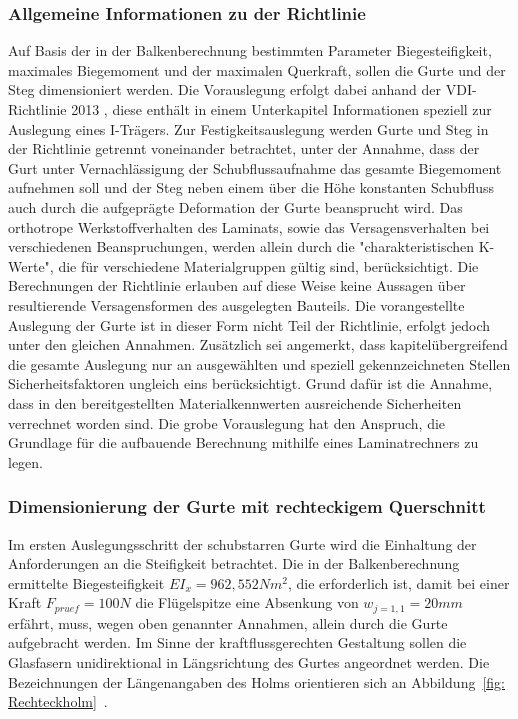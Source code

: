 \subsubsection{Allgemeine Informationen zu der Richtlinie}
Auf Basis der in der Balkenberechnung bestimmten Parameter Biegesteifigkeit, maximales Biegemoment und der maximalen Querkraft, sollen die Gurte und der Steg dimensioniert werden. Die Vorauslegung erfolgt dabei anhand der VDI-Richtlinie 2013 \cite{item5}, diese enthält in einem Unterkapitel Informationen speziell zur Auslegung eines I-Trägers. Zur Festigkeitsauslegung werden Gurte und Steg in der Richtlinie getrennt voneinander betrachtet, unter der Annahme, dass der Gurt unter Vernachlässigung der Schubflussaufnahme das gesamte Biegemoment aufnehmen soll und der Steg neben einem über die Höhe konstanten Schubfluss auch durch die aufgeprägte Deformation der Gurte beansprucht wird. Das orthotrope Werkstoffverhalten des Laminats, sowie das Versagensverhalten bei verschiedenen Beanspruchungen, werden allein durch die "charakteristischen K-Werte", die für verschiedene Materialgruppen gültig sind, berücksichtigt. Die Berechnungen der Richtlinie erlauben auf diese Weise keine Aussagen über resultierende Versagensformen des ausgelegten Bauteils. Die vorangestellte Auslegung der Gurte ist in dieser Form nicht Teil der Richtlinie, erfolgt jedoch unter den gleichen Annahmen.     
Zusätzlich sei angemerkt, dass kapitelübergreifend die gesamte Auslegung nur an ausgewählten und speziell gekennzeichneten Stellen Sicherheitsfaktoren ungleich eins berücksichtigt. Grund dafür ist die Annahme, dass in den bereitgestellten Materialkennwerten ausreichende Sicherheiten verrechnet worden sind. Die grobe Vorauslegung hat den Anspruch, die Grundlage für die aufbauende Berechnung mithilfe eines Laminatrechners zu legen.

\subsubsection{Dimensionierung der Gurte mit rechteckigem Querschnitt}
\label{GurtDim} 
Im ersten Auslegungsschritt der schubstarren Gurte wird die Einhaltung der Anforderungen an die Steifigkeit betrachtet.   
Die in der Balkenberechnung ermittelte Biegesteifigkeit $ EI_{x} = 962,552 Nm^{2} $, die erforderlich ist, damit bei einer Kraft $ F_{pruef}=100N $ die Flügelspitze eine Absenkung von $ w_{j=1,1}=20mm $ erfährt, muss, wegen oben genannter Annahmen, allein durch die Gurte aufgebracht werden. Im Sinne der kraftflussgerechten Gestaltung sollen die Glasfasern unidirektional in Längsrichtung des Gurtes angeordnet werden. Die Bezeichnungen der Längenangaben des Holms orientieren sich an Abbildung~\ref{fig: Rechteckholm}~.\\

